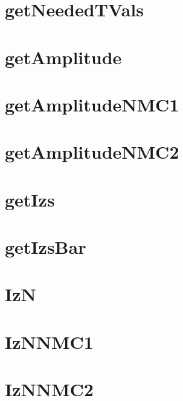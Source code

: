 \documentclass{book}
\begin{document}
\section{getNeededTVals}

\section{getAmplitude}

\section{getAmplitudeNMC1}

\section{getAmplitudeNMC2}

\section{getIzs}

\section{getIzsBar}

\section{IzN}

\section{IzNNMC1}

\section{IzNNMC2}
\end{document}
